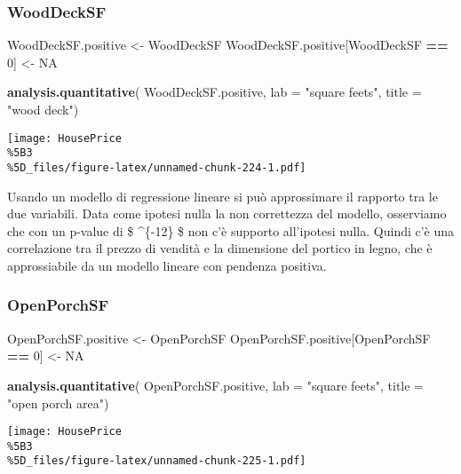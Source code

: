 \documentclass[
]{article}
\newenvironment{Shaded}{\begin{snugshade}}{\end{snugshade}}
\newcommand{\AttributeTok}[1]{\textcolor[rgb]{0.13,0.29,0.53}{#1}}
\newcommand{\ConstantTok}[1]{\textcolor[rgb]{0.56,0.35,0.01}{#1}}
\newcommand{\DecValTok}[1]{\textcolor[rgb]{0.00,0.00,0.81}{#1}}
\newcommand{\FunctionTok}[1]{\textcolor[rgb]{0.13,0.29,0.53}{\textbf{#1}}}
\newcommand{\NormalTok}[1]{#1}
\newcommand{\OtherTok}[1]{\textcolor[rgb]{0.56,0.35,0.01}{#1}}
\newcommand{\SpecialCharTok}[1]{\textcolor[rgb]{0.81,0.36,0.00}{\textbf{#1}}}
\newcommand{\StringTok}[1]{\textcolor[rgb]{0.31,0.60,0.02}{#1}}
\begin{document}
\subsubsection{WoodDeckSF}\label{wooddecksf-1}

\begin{Shaded}
\begin{Highlighting}[]
\NormalTok{WoodDeckSF.positive }\OtherTok{\textless{}{-}}\NormalTok{ WoodDeckSF}
\NormalTok{WoodDeckSF.positive[WoodDeckSF }\SpecialCharTok{==} \DecValTok{0}\NormalTok{] }\OtherTok{\textless{}{-}} \ConstantTok{NA}

\FunctionTok{analysis.quantitative}\NormalTok{(}
\NormalTok{    WoodDeckSF.positive,}
    \AttributeTok{lab =} \StringTok{"square feets"}\NormalTok{,}
    \AttributeTok{title =} \StringTok{"wood deck"}\NormalTok{)}
\end{Highlighting}
\end{Shaded}

\texttt{[image: HousePrice\\\%5B3\\\%5D\_files/figure-latex/unnamed-chunk-224-1.pdf]}

Usando un modello di regressione lineare si può approssimare il rapporto
tra le due variabili. Data come ipotesi nulla la non correttezza del
modello, osserviamo che con un p-value di \$ \^{}\{-12\} \$
non c'è supporto all'ipotesi nulla. Quindi c'è una correlazione tra il
prezzo di vendità e la dimensione del portico in legno, che è
approssiabile da un modello lineare con pendenza positiva.

\subsubsection{OpenPorchSF}\label{openporchsf-1}

\begin{Shaded}
\begin{Highlighting}[]
\NormalTok{OpenPorchSF.positive }\OtherTok{\textless{}{-}}\NormalTok{ OpenPorchSF}
\NormalTok{OpenPorchSF.positive[OpenPorchSF }\SpecialCharTok{==} \DecValTok{0}\NormalTok{] }\OtherTok{\textless{}{-}} \ConstantTok{NA}

\FunctionTok{analysis.quantitative}\NormalTok{(}
\NormalTok{    OpenPorchSF.positive,}
    \AttributeTok{lab =} \StringTok{"square feets"}\NormalTok{,}
    \AttributeTok{title =} \StringTok{"open porch area"}\NormalTok{)}
\end{Highlighting}
\end{Shaded}

\texttt{[image: HousePrice\\\%5B3\\\%5D\_files/figure-latex/unnamed-chunk-225-1.pdf]}
\end{document}
